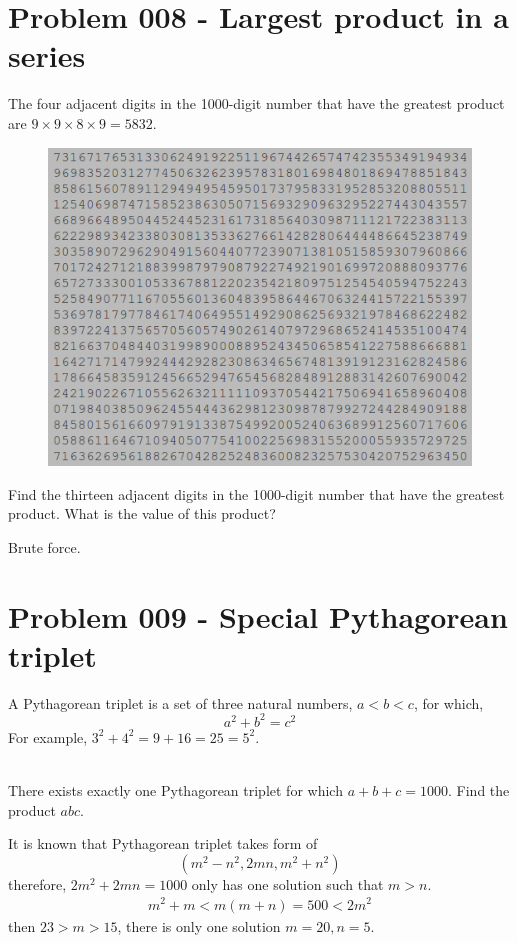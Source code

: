 \section{Problem 008 - Largest product in a series}
\begin{prob}
The four adjacent digits in the 1000-digit number that have the greatest product are $9 \times 9 \times 8 \times 9 = 5832$.

\begin{figure}[hb!]
\begin{center}
\includegraphics[scale = 0.52]{pic/008.png}
\end{center}
\end{figure}


\noindent Find the thirteen adjacent digits in the 1000-digit number that have the greatest product. What is the value of this product?
\end{prob}

\begin{sol}
Brute force.
\end{sol}

\section{Problem 009 - Special Pythagorean triplet}
\begin{prob}
A Pythagorean triplet is a set of three natural numbers, $a < b < c$, for which,
$$a^2 + b^2 = c^2$$
For example, $3^2 + 4^2 = 9 + 16 = 25 = 5^2$.

\noindent\\ There exists exactly one Pythagorean triplet for which $a + b + c = 1000$.
Find the product $abc$.
\end{prob}
\begin{sol}
It is known that Pythagorean triplet takes form of
$$(m^2 - n^2, 2mn, m^2 + n^2)$$
therefore, $2m^2 + 2mn = 1000$ only has one solution such that $m > n$.
\begin{eqnarray}
m^2 + m < m(m + n) = 500 < 2 m ^2
\end{eqnarray}
then $23 > m > 15$, there is only one solution $m = 20, n = 5$.
\end{sol}


